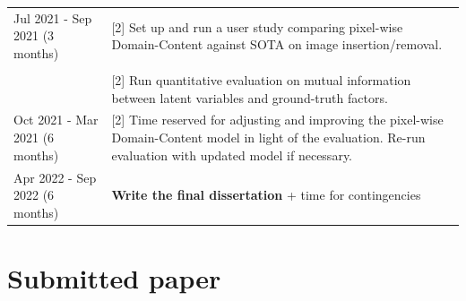 \documentclass[withindex,glossary,firstyr,times]{cam-thesis}
\begin{document}
\begin{table}
\begin{tabular}{p{}p{}}
    \midrule
    Jul 2021 - Sep 2021 \hspace{1em} (3 months) & [2] Set up and run a user study comparing pixel-wise Domain-Content against SOTA on image insertion/removal. \\ & \\ & [2] Run quantitative evaluation on mutual information between latent variables and ground-truth factors.\\
    \midrule
    Oct 2021 - Mar 2021 (6 months) & [2] Time reserved for adjusting and improving the pixel-wise Domain-Content model in light of the evaluation. Re-run evaluation with updated model if necessary. \\
    \midrule
    Apr 2022 - Sep 2022 \hspace{1em} (6 months) &  \textbf{Write the final dissertation} + time for contingencies \\
    \bottomrule
  \end{tabular}
\end{table}



\cleardoublepage
{}
{}




\appendix

\chapter{Submitted paper}
\label{appendix}
\end{document}
